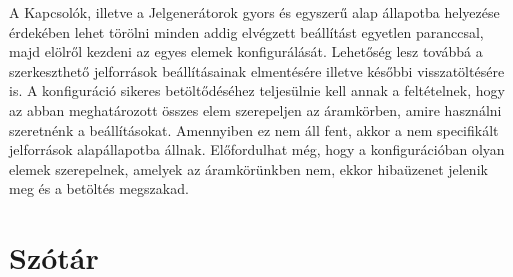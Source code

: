 A Kapcsolók, illetve a Jelgenerátorok gyors és egyszerű alap állapotba helyezése érdekében lehet törölni minden addig elvégzett beállítást egyetlen paranccsal, majd elölről kezdeni az egyes elemek konfigurálását. Lehetőség lesz továbbá a szerkeszthető jelforrások beállításainak elmentésére illetve későbbi visszatöltésére is. A konfiguráció sikeres betöltődéséhez teljesülnie kell annak a feltételnek, hogy az abban meghatározott összes elem szerepeljen az áramkörben, amire használni szeretnénk a beállításokat. Amennyiben ez nem áll fent, akkor a nem specifikált jelforrások alapállapotba állnak. Előfordulhat még, hogy a konfigurációban olyan elemek szerepelnek, amelyek az áramkörünkben nem, ekkor hibaüzenet jelenik meg és a betöltés megszakad.

\section{Szótár}
\label{sec:dictionary}

